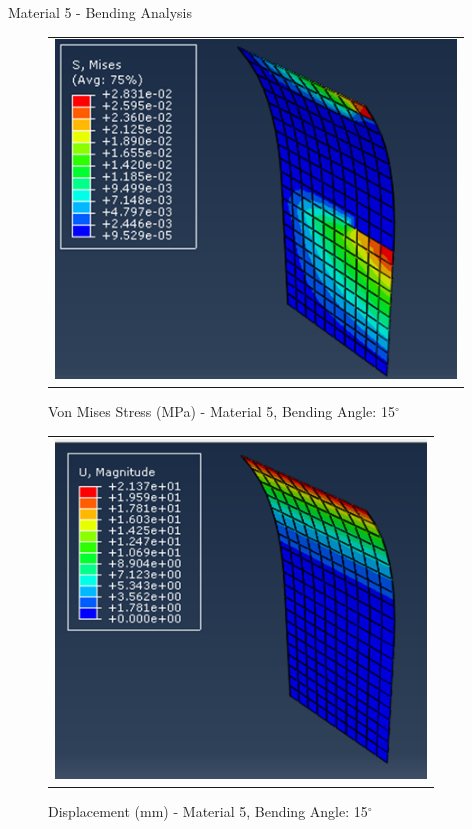 \documentclass[a4paper,12pt]{article}
\numberwithin{equation}{section}
\numberwithin{figure}{section}
\begin{document}

\newpage
\noindent Material 5 - Bending Analysis 
\begin{figure}[H]
  \centering
  \begin{tabular}{@{}c@{}}
    \includegraphics[width=0.7\linewidth,height=255pt]{Results/Bending/M5_VMS_15.png} \\
  \end{tabular}
  \caption{Von Mises Stress (MPa) - Material 5,  Bending Angle: 15$^{\circ}$ }
\end{figure}

\begin{figure}[H]
  \centering
  \begin{tabular}{@{}c@{}}
    \includegraphics[width=0.7\linewidth,height=255pt]{Results/Bending/M5_DIS_15.png} \\
  \end{tabular}
  \caption{Displacement (mm) - Material 5, Bending Angle: 15$^{\circ}$ }
\end{figure}
\end{document}
